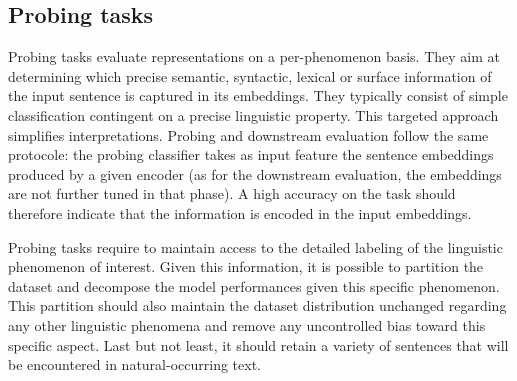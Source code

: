 \subsection{Probing tasks}





Probing tasks evaluate representations on a per-phenomenon basis. They aim at determining  which precise semantic, syntactic, lexical or surface information of the input sentence is captured in its embeddings. They typically consist of simple classification contingent on a precise linguistic property. This targeted approach simplifies interpretations. Probing and downstream evaluation follow the same protocole: the probing classifier takes as input feature the sentence embeddings produced by a given encoder (as for the downstream evaluation, the embeddings are not further tuned in that phase). A high accuracy on the task should therefore indicate that the information is encoded in the input embeddings.

Probing tasks require to maintain access to the detailed labeling of the linguistic phenomenon of interest. Given this information, it is possible to partition the dataset and decompose the model performances given this specific phenomenon. This partition should also maintain the dataset distribution unchanged regarding any other linguistic phenomena and remove any uncontrolled bias toward this specific aspect. Last but not least, it should retain a variety of sentences that will be encountered in natural-occurring text.

